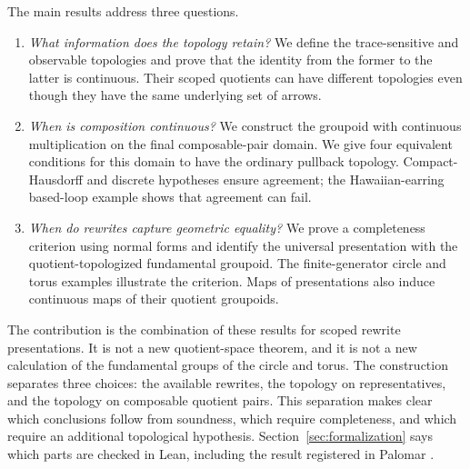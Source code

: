 \documentclass[10pt,reqno]{amsart}
\theoremstyle{definition}
\theoremstyle{plain}
\theoremstyle{remark}
\begin{document}
The main results address three questions.
\begin{enumerate}[label=(\roman*),leftmargin=2.2em]
\item \emph{What information does the topology retain?}
  We define the trace-sensitive and observable topologies and prove that the
  identity from the former to the latter is continuous.  Their scoped
  quotients can have different topologies even though they have the same
  underlying set of arrows.
\item \emph{When is composition continuous?}
  We construct the groupoid with continuous multiplication on the final
  composable-pair domain.  We give four equivalent conditions for this
  domain to have the ordinary pullback topology.  Compact-Hausdorff and
  discrete hypotheses ensure agreement; the Hawaiian-earring based-loop
  example shows that agreement can fail.
\item \emph{When do rewrites capture geometric equality?}
  We prove a completeness criterion using normal forms and identify the
  universal presentation with the quotient-topologized fundamental groupoid.
  The finite-generator circle and torus examples illustrate the criterion.
  Maps of presentations also induce continuous maps of their quotient
  groupoids.
\end{enumerate}

The contribution is the combination of these results for scoped rewrite
presentations.  It is not a new quotient-space theorem, and it is not a new
calculation of the fundamental groups of the circle and torus.  The construction separates
three choices: the available rewrites, the topology on representatives, and
the topology on composable quotient pairs.  This separation makes clear which
conclusions follow from soundness, which require completeness, and which
require an additional topological hypothesis.  Section~\ref{sec:formalization} says which parts
are checked in Lean, including the result registered in Palomar
\cite{PalomarScoped2026}.
\end{document}
